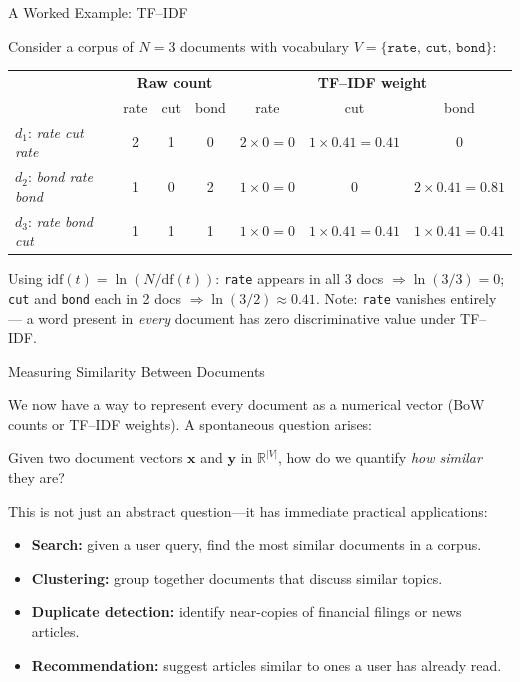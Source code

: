 \documentclass[aspectratio=169]{beamer}
\begin{document}
%
%
\begin{frame}{A Worked Example: TF--IDF}

Consider a corpus of $N=3$ documents with vocabulary
$V = \{\texttt{rate},\,\texttt{cut},\,\texttt{bond}\}$:

\vspace{0.08cm}
\begin{center}
\renewcommand{\arraystretch}{1.2}
\begin{tabular}{lccc|ccc}
\toprule
 & \multicolumn{3}{c|}{\textbf{Raw count}} & \multicolumn{3}{c}{\textbf{TF--IDF weight}} \\
 & rate & cut & bond & rate & cut & bond \\
\midrule
$d_1$: \textit{rate cut rate} & 2 & 1 & 0 & $2\!\times\!0 = 0$ & $1\!\times\!0.41 = 0.41$ & 0 \\
$d_2$: \textit{bond rate bond} & 1 & 0 & 2 & $1\!\times\!0 = 0$ & 0 & $2\!\times\!0.41 = 0.81$ \\
$d_3$: \textit{rate bond cut} & 1 & 1 & 1 & $1\!\times\!0 = 0$ & $1\!\times\!0.41 = 0.41$ & $1\!\times\!0.41 = 0.41$ \\
\bottomrule
\end{tabular}
\end{center}
{Using $\mathrm{idf}(t)=\ln(N/\mathrm{df}(t))$:
\texttt{rate} appears in all 3 docs $\Rightarrow \ln(3/3)=0$;
\texttt{cut} and \texttt{bond} each in 2 docs $\Rightarrow \ln(3/2)\approx 0.41$.
Note: \texttt{rate} vanishes entirely --- a word present in \emph{every} document has zero
discriminative value under TF--IDF.}

\end{frame}
%
%
\begin{frame}{Measuring Similarity Between Documents}

We now have a way to represent every document as a numerical vector
(BoW counts or TF--IDF weights).  A spontaneous question arises:

\begin{tcolorbox}[colback=blue!5!white, colframe=blue!75!black,
  title=\textbf{The core question}]
Given two document vectors $\mathbf{x}$ and $\mathbf{y}$
in $\mathbb{R}^{|V|}$, how do we quantify
\emph{how similar} they are?
\end{tcolorbox}

\medskip
This is not just an abstract question---it has immediate practical
applications:

\begin{itemize}
\item \textbf{Search:} given a user query, find the most similar
      documents in a corpus.
\item \textbf{Clustering:} group together documents that discuss
      similar topics.
\item \textbf{Duplicate detection:} identify near-copies of
      financial filings or news articles.
\item \textbf{Recommendation:} suggest articles similar to ones
      a user has already read.
\end{itemize}

\end{frame}
\end{document}
